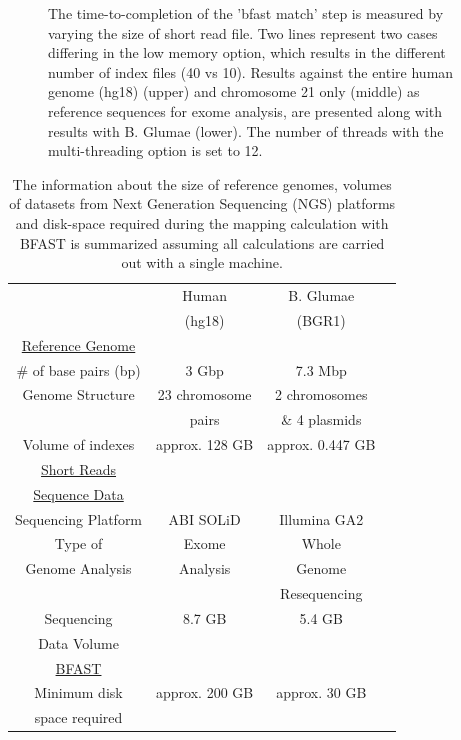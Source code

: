 \documentclass{acm_proc_article-sp}
\begin{document}
\begin{figure}

\caption{\small The time-to-completion of the 'bfast match' step is
  measured by varying the size of short read file.  Two lines
  represent two cases differing in the low memory option, which
  results in the different number of index files (40 vs 10).  Results against the entire human genome (hg18) (upper) and chromosome 21 only (middle) as reference sequences for exome analysis, are presented along with results with B. Glumae (lower).  The number of threads with the multi-threading option is set to 12.}
  \label{fig:parallel-execution} 
 \end{figure}




\begin{table}
\small
\begin{tabular}{|c|c|c|c|} 
  \hline 
   & Human & B. Glumae   \\ 
& (hg18) & (BGR1)\\   
   
   \hline \hline
 \underline{Reference Genome} & &  \\
    \# of base pairs (bp) &  3 Gbp & 7.3 Mbp \\ \hline
   Genome Structure &   23 chromosome  & 2 chromosomes  \\  
   &   pairs & \& 4 plasmids \\ \hline
    Volume of indexes  & approx. 128 GB  & approx. 0.447 GB  \\ 
      \hline \hline
    \underline{Short Reads} & &   \\
        \underline{Sequence Data}& &    \\
          Sequencing Platform & ABI SOLiD  &  Illumina GA2 \\ \hline
  Type of  &  Exome  & Whole \\ 
  
Genome Analysis  & Analysis &  Genome \\
&& Resequencing \\  \hline

  Sequencing   & 8.7 GB & 5.4 GB \\
  Data Volume&&\\
  
  
  \hline  \hline
  \underline{BFAST} & &  \\
  Minimum disk &  approx. 200 GB   &    approx. 30 GB   \\
space required & &\\
\hline  \hline
\end{tabular} \caption{The information about the size of reference genomes, volumes of datasets from
 Next Generation Sequencing (NGS) platforms and disk-space required during the mapping calculation 
 with BFAST is summarized assuming all calculations are carried out with a single machine.}
 \label{table:two-genomes} 
\end{table}
\end{document}
